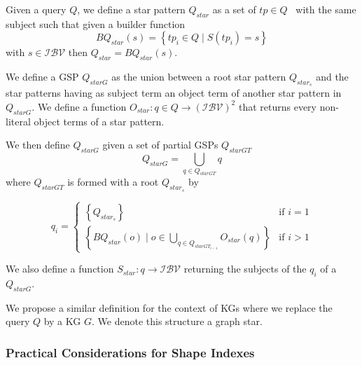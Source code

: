 \begin{definition}
	Given a query $Q$, we define a star pattern $Q_{star}$ as a set of $tp \in Q$~\cite{Karim2020} with the same subject such that
	given a builder function
	\begin{equation}
		BQ_{star}(s) = \left\{ tp_i \in Q \mid S(tp_i) = s \right\}
	\end{equation}
	with $s \in \mathcal{I}\mathcal{B}\mathcal{V}$ then $Q_{star} = BQ_{star}(s)$.

\end{definition}

\begin{definition}\label{def:starPattern}

	We define a \ac{GSP} $Q_{starG}$ as the union between a root star pattern $Q_{star_s}$
	and the star patterns having as subject term an object term of another star pattern in $Q_{starG}$.
	We define a function
	$O_{star}: q \in Q \rightarrow  (\mathcal{I}\mathcal{B}\mathcal{V})^2$
	that returns every non-literal object terms of a star pattern.

	We then define $Q_{starG}$ given a  set of partial \acp{GSP} $Q_{starGT}$
	\begin{equation}
		Q_{starG} = \bigcup_{q \in Q_{starGT}} q
	\end{equation}
	where $Q_{starGT}$ is formed with a root $Q_{star_s}$ by

	\begin{equation}
		q_i =
		\begin{cases}
			\left\{ Q_{star_s} \right\}                                                           & \text{if } i = 1 \\
			\left\{ BQ_{star}(o) \mid o \in \bigcup_{q \in Q_{starGT_{i-1}}} O_{star}(q) \right\} & \text{if } i>1
		\end{cases}
	\end{equation}

	We also define a function
	$S_{star}: q \rightarrow  \mathcal{I}\mathcal{B}\mathcal{V}$
	returning the subjects of the $q_i$ of a $Q_{starG}$.

	We propose a similar definition for the context of \acp{KG} where we replace the query $Q$ by a \ac{KG} $G$.
	We denote this structure a graph star.

\end{definition}

\subsubsection{Practical Considerations for Shape Indexes}

